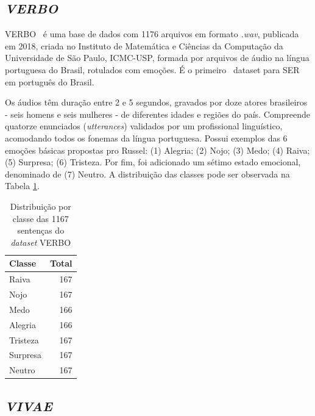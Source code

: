 \subsection{\textit{VERBO}}\label{subsection:verbo}

\acrlong{VERBO}~\cite{12.21} é uma base de dados com 1176 arquivos em formato \textit{.wav}, publicada em 2018, criada no Instituto de Matemática e Ciências da Computação da Universidade de São Paulo, ICMC-USP, formada por arquivos de áudio na língua portuguesa do Brasil, rotulados com emoções. É o primeiro~\cite{21} dataset para \acrshort{SER} em português do Brasil.

Os áudios têm duração entre 2 e 5 segundos, gravados por doze atores brasileiros - seis homens e seis mulheres - de diferentes idades e regiões do país. Compreende quatorze enunciados (\textit{utterances}) validados por um profissional linguístico, acomodando todos os fonemas da língua portuguesa. Possui exemplos das 6 emoções básicas propostas pro Russel: (1) Alegria; (2) Nojo; (3) Medo; (4) Raiva; (5) Surpresa; (6) Tristeza. Por fim, foi adicionado um sétimo estado emocional, denominado de (7) Neutro. A distribuição das classes pode ser observada na Tabela \ref{table:verbo}.

\begin{table}[]
\centering
\caption{Distribuição por classe das 1167 sentenças do \textit{dataset} VERBO}
    \begin{tabular}{|l|r|}
    \hline
        Classe & Total \\ \hline
        Raiva & 167  \\ \hline
        Nojo & 167  \\ \hline
        Medo & 166  \\ \hline
        Alegria & 166  \\ \hline
        Tristeza & 167  \\ \hline
        Surpresa & 167  \\ \hline
        Neutro & 167  \\ \hline
    \end{tabular}\label{table:verbo}
\end{table}

\subsection{\textit{VIVAE}}\label{subsection:vivae}

